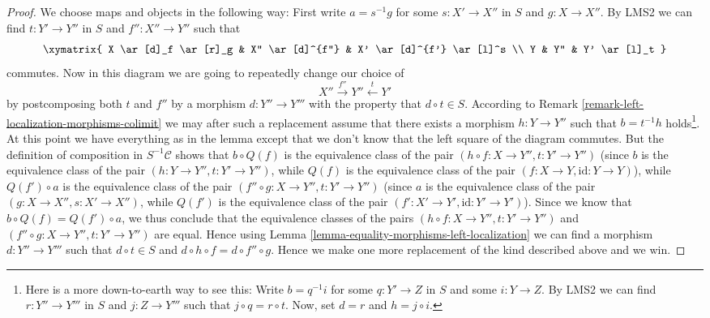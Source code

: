 \begin{proof}
We choose maps and objects in the following way:
First write $a = s^{-1}g$ for some $s : X' \to X''$ in $S$ and
$g : X \to X''$. By LMS2 we can find $t : Y' \to Y''$ in $S$ and
$f'' : X'' \to Y''$ such that
$$
\xymatrix{
X \ar[d]_f \ar[r]_g & X'' \ar[d]^{f''} & X' \ar[d]^{f'} \ar[l]^s \\
Y & Y'' & Y' \ar[l]_t
}
$$
commutes. Now in this diagram we are going to repeatedly change our
choice of
$$
X'' \xrightarrow{f''} Y'' \xleftarrow{t} Y'
$$
by postcomposing both $t$ and $f''$ by a morphism $d : Y'' \to Y'''$
with the property that $d \circ t \in S$. According to
Remark \ref{remark-left-localization-morphisms-colimit}
we may after such a replacement assume that there exists a morphism
$h : Y \to Y''$ such that $b = t^{-1}h$ holds\footnote{Here is a
more down-to-earth way to see this:
Write $b = q^{-1}i$ for some $q : Y' \to Z$ in $S$ and some
$i : Y \to Z$. By LMS2 we can find $r : Y'' \to Y'''$ in $S$ and
$j : Z \to Y'''$ such that $j \circ q = r \circ t$. Now, set
$d = r$ and $h = j \circ i$.}. At this point we have everything
as in the lemma except that we don't know that the left square of the
diagram commutes.
But the definition of composition in $S^{-1} \mathcal{C}$ shows that
$b \circ Q\left(f\right)$ is the equivalence class of the pair
$(h \circ f : X \to Y'', t : Y' \to Y'')$ (since $b$ is the
equivalence class of the pair $(h : Y \to Y'', t : Y' \to Y'')$,
while $Q\left(f\right)$ is the equivalence class of the pair
$(f : X \to Y, \text{id} : Y \to Y)$), while
$Q\left(f'\right) \circ a$ is the equivalence class of the pair
$(f'' \circ g : X \to Y'', t : Y' \to Y'')$ (since $a$ is the
equivalence class of the pair $(g : X \to X'', s : X' \to X'')$,
while $Q\left(f'\right)$ is the equivalence class of the pair
$(f' : X' \to Y', \text{id} : Y' \to Y')$).
Since we know that
$b \circ Q\left(f\right) = Q\left(f'\right) \circ a$, we thus
conclude that the equivalence classes of the pairs
$(h \circ f : X \to Y'', t : Y' \to Y'')$ and
$(f'' \circ g : X \to Y'', t : Y' \to Y'')$ are equal.
Hence using
Lemma \ref{lemma-equality-morphisms-left-localization}
we can find a morphism $d : Y'' \to Y'''$ such that
$d \circ t \in S$ and $d \circ h \circ f = d \circ f'' \circ g$.
Hence we make one more replacement of the kind described
above and we win.
\end{proof}


